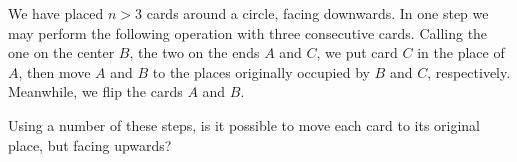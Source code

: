 We have placed $n>3$ cards around a circle, facing downwards. In one step we may perform the following operation with three consecutive cards. Calling the one on the center $B$, the two on the ends $A$ and $C$, we put card $C$ in the place of $A$, then move $A$ and $B$ to the places originally occupied by $B$ and $C$, respectively. Meanwhile, we flip the cards $A$ and $B$.

Using a number of these steps, is it possible to move each card to its original place, but facing upwards?